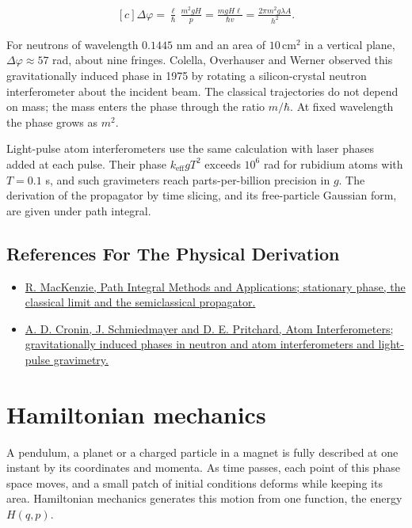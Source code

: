 \documentclass[11pt,oneside]{book}
\newenvironment{centeredalign}{\[\begin{gathered}[c]}{\end{gathered}\]}
\begin{document}
\begin{centeredalign}
\Delta\varphi=\frac{\ell}{\hbar}\,\frac{m^2gH}{p}=\frac{mgH\ell}{\hbar v}
=\frac{2\pi m^2g\lambda A}{h^2}.
\end{centeredalign}

For neutrons of wavelength \(0.1445\) nm and an area of \(10\,\mathrm{cm}^2\) in a vertical plane, \(\Delta\varphi\approx57\) rad, about nine fringes. Colella, Overhauser and Werner observed this gravitationally induced phase in 1975 by rotating a silicon-crystal neutron interferometer about the incident beam. The classical trajectories do not depend on mass; the mass enters the phase through the ratio \(m/\hbar\). At fixed wavelength the phase grows as \(m^2\).

Light-pulse atom interferometers use the same calculation with laser phases added at each pulse. Their phase \(k_{\mathrm{eff}}gT^2\) exceeds \(10^6\) rad for rubidium atoms with \(T=0.1\) s, and such gravimeters reach parts-per-billion precision in \(g\). The derivation of the propagator by time slicing, and its free-particle Gaussian form, are given under path integral.

\subsection*{References For The Physical Derivation}
\begin{itemize}
\item \href{https://arxiv.org/abs/quant-ph/0004090}{R. MacKenzie, Path Integral Methods and Applications; stationary phase, the classical limit and the semiclassical propagator.}
\item \href{https://arxiv.org/abs/0712.3703}{A. D. Cronin, J. Schmiedmayer and D. E. Pritchard, Atom Interferometers; gravitationally induced phases in neutron and atom interferometers and light-pulse gravimetry.}
\end{itemize}





\clearpage

\section{Hamiltonian mechanics}

\label{topic:hamiltonian-mechanics}

A pendulum, a planet or a charged particle in a magnet is fully described at one instant by its coordinates and momenta. As time passes, each point of this phase space moves, and a small patch of initial conditions deforms while keeping its area. Hamiltonian mechanics generates this motion from one function, the energy \(H(q,p)\).
\end{document}
